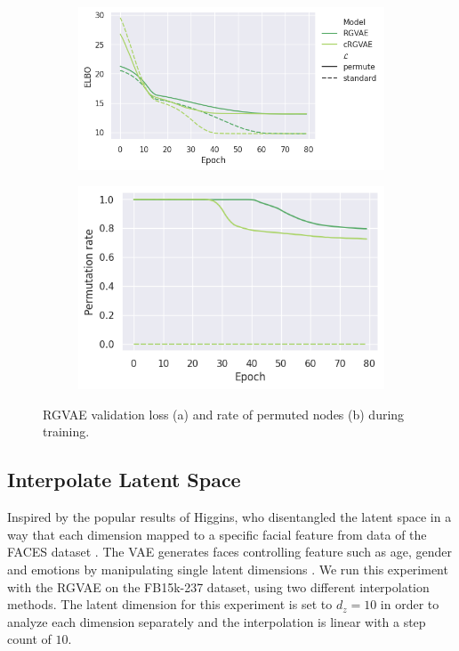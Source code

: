 \begin{figure}
  \right
  \begin{subfigure}{.55\textwidth}
    \left
    \includegraphics[height=.5\textwidth, keepaspectratio]{graphs/plots/permute_loss.png}
    \label{fig5:permELBO}
  \end{subfigure}%
  \begin{subfigure}{.55\textwidth}
    \left
    \includegraphics[height=.5\textwidth]{graphs/plots/permute_permutation_wol.png}
    \label{fig5:permRate}
  \end{subfigure}
  \caption{RGVAE validation loss (a) and rate of permuted nodes (b) during training.}
  \label{fig5:permInv}
\end{figure}

\subsection{Interpolate Latent Space}

Inspired by the popular results of Higgins, who disentangled the latent space in a way that each dimension mapped to a specific facial feature from data of the FACES dataset \cite{ebner_facesdatabase_2010}. The VAE generates faces controlling feature such as age, gender and emotions by manipulating single latent dimensions \cite{higgins_beta-vae_2016}.  We run this experiment with the RGVAE on the FB15k-237 dataset, using two different interpolation methods. The latent dimension for this experiment is set to $d_{z}=10$ in order to analyze each dimension separately and the interpolation is linear with a step count of $10$.

